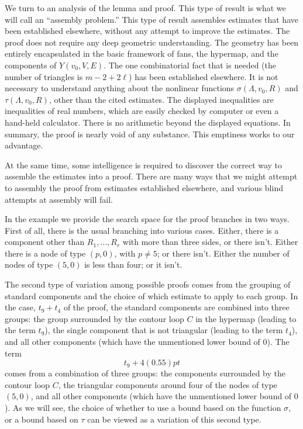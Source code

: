 We turn to an analysis of the lemma and proof.  This type of result is what
we will call an ``assembly problem.''  This type of result
assembles estimates that have been established elsewhere, without
any attempt to improve the estimates.  The proof
does not require any deep geometric understanding.  The geometry
has been entirely encapsulated in the basic framework of
fans, the hypermap, and the components
of $Y(v_0,V,E)$.  The one combinatorial fact that is needed
(the number of triangles is $m-2+2\ell$) 
has been established elsewhere.  It is not necessary
to understand anything about the nonlinear functions $\sigma(\Lambda,v_0,R)$
and $\tau(\Lambda,v_0,R)$, other than the cited estimates.   
The displayed inequalities are inequalities of real numbers,
which are easily checked by computer
or even a hand-held calculator.  There is no arithmetic beyond
the displayed equations.
In summary,
the proof is nearly void of any substance.   This emptiness
works to our advantage.

At the same time, some intelligence is required to discover the
correct way to assemble the estimates into a proof.   There are
many ways that we might attempt to assembly the proof from estimates
established elsewhere, and various blind attempts at assembly will
fail.  

In the example we provide the search space for the proof
branches in two ways.  First of all, there is the usual branching
into various cases.  Either, there is a component other than
$R_1,\ldots,R_r$ with more than three sides, or there isn't.
Either there is a node of type $(p,0)$, with $p\ne 5$; or there isn't.
Either the number of nodes of type $(5,0)$ is less than four; or it isn't.

The second type of variation among possible proofs comes from
the grouping of standard components and the choice of which estimate
to apply to each group.  In the case, $t_9+t_4$ of the proof, the
standard components are combined into three groups:
the group surrounded by the contour loop $C$ in the hypermap
(leading to the term $t_9$), the single component that is not triangular
(leading to the term $t_4$), and all other components (which have
the unmentioned lower bound of $0$).  The term
   $$
   t_9 + 4(0.55)pt 
   $$
comes from a combination of three groups:
the components surrounded by the contour loop $C$, the triangular
components around four of the nodes of type $(5,0)$, and all other
components (which have the unmentioned lower bound of $0$).
As we will see, the choice of whether to use a bound based on
the function $\sigma$, or a bound based on $\tau$ can be
viewed as a variation of this second type.

